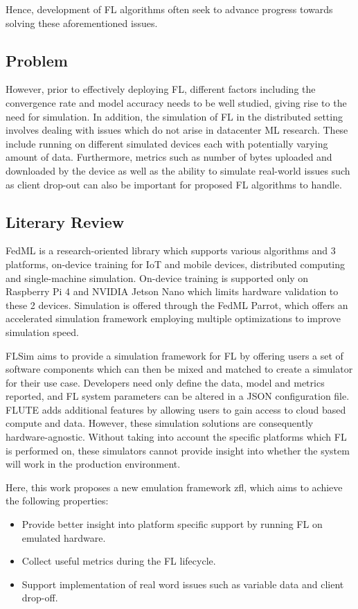 \documentclass[12pt]{article}
\begin{document}
Hence, development of FL algorithms often seek to advance progress towards solving these
aforementioned issues.

\subsection{Problem}
However, prior to effectively deploying FL, different factors including the convergence rate and
model accuracy needs to be well studied, giving rise to the need for simulation. In addition, the
simulation of FL in the distributed setting involves dealing with
issues which do not arise in datacenter ML research. These include running on different simulated
devices each with potentially varying amount of data. Furthermore, metrics such as number of bytes uploaded and
downloaded by the device as well as the ability to simulate real-world issues such as client
drop-out can also be important for proposed FL algorithms to handle.

\subsection{Literary Review}
FedML\cite{} is a research-oriented library which supports various algorithms and 3 platforms, on-device training for IoT and
mobile devices, distributed computing and single-machine simulation. On-device training is supported
only on Raspberry Pi 4 and NVIDIA Jetson Nano which limits hardware validation to these 2 devices.
Simulation is offered through the FedML Parrot\cite{}, which offers an accelerated simulation
framework employing multiple optimizations to improve simulation speed.

FLSim\cite{} aims to provide a simulation framework for FL by offering users a set of software components
which can then be mixed and matched to create a simulator for their use case. Developers need only
define the data, model and metrics reported, and FL system parameters can be altered in a JSON
configuration file. FLUTE\cite{} adds additional features by allowing users to gain access to cloud based
compute and data. However, these simulation solutions are consequently hardware-agnostic. Without
taking into account the specific platforms which FL is performed on, these simulators cannot provide
insight into whether the system will work in the production environment.

Here, this work proposes a new emulation framework zfl, which aims to achieve the following
properties:
\begin{itemize}
  \item Provide better insight into platform specific support by running FL on emulated hardware.
  \item Collect useful metrics during the FL lifecycle.
  \item Support implementation of real word issues such as variable data and client drop-off.
\end{itemize}
\end{document}
